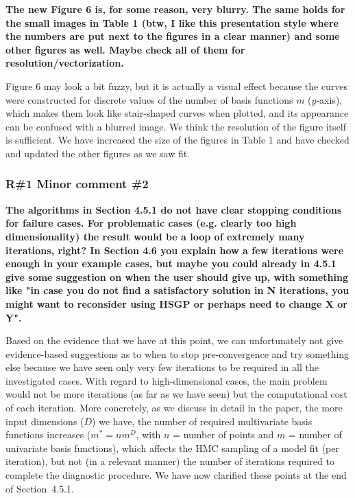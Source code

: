 \documentclass[11pt]{report}
\begin{document}
\textbf{The new Figure 6 is, for some reason, very blurry. The same holds for the small images in Table 1 (btw, I like this presentation style where the numbers are put next to the figures in a clear manner) and some other figures as well. Maybe check all of them for resolution/vectorization.}

Figure 6 may look a bit fuzzy, but it is actually a visual effect because the curves were constructed for discrete values of the number of basis functions $m$ ($y$-axis), which makes them look like stair-shaped curves when plotted, and its appearance can be confused with a blurred image. We think the resolution of the figure itself is sufficient. We have increased the size of the figures in Table 1 and have checked and updated the other figures as we saw fit.

\subsubsection*{R\#1 Minor comment \#2}

\textbf{The algorithms in Section 4.5.1 do not have clear stopping conditions for failure cases.  For problematic cases (e.g. clearly too high dimensionality) the result would be a loop of  extremely many iterations, right? In Section 4.6 you explain how a few iterations were enough in your example cases, but maybe you could already in 4.5.1 give some suggestion on when the user should give up, with something like "in case you do not find a satisfactory solution in N iterations, you might want to reconsider using HSGP or perhaps need to change X or Y".}

Based on the evidence that we have at this point, we can unfortunately not give evidence-based suggestions as to when to stop pre-convergence and try something else because we have seen only very few iterations to be required in all the investigated cases. With regard to high-dimensional cases, the main problem would not be more iterations (as far as we have seen) but the computational cost of each iteration. More concretely, as we discuss in detail in the paper, the more input dimensions ($D$) we have, the number of required multivariate basis functions increases ($m^*=nm^D$, with $n$ = number of points and $m$ = number of univariate basis functions), which affects the HMC sampling of a model fit (per iteration), but not (in a relevant manner) the number of iterations required to complete the diagnostic procedure. We have now clarified these points at the end of Section~4.5.1.
\end{document}
